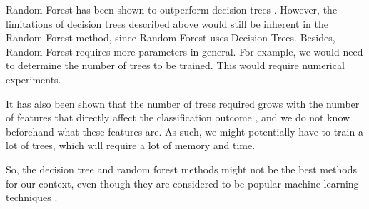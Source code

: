 \documentclass[12pt, twoside, a4paper]{report}
\begin{document}
Random Forest has been shown to outperform decision trees \cite{RefWorks:103}. However, the limitations of decision trees described above would still be inherent in the Random Forest method, since Random Forest uses Decision Trees. Besides, Random Forest requires more parameters in general. For example, we would need to determine the number of trees to be trained. This would require numerical experiments.

It has also been shown that the number of trees required grows with the number of features that directly affect the classification outcome \cite{RefWorks:102}, and we do not know beforehand what these features are. As such, we might potentially have to train a lot of trees, which will require a lot of memory and time.

So, the decision tree and random forest methods might not be the best methods for our context, even though they are considered to be popular machine learning techniques \cite{RefWorks:103}.
\end{document}
